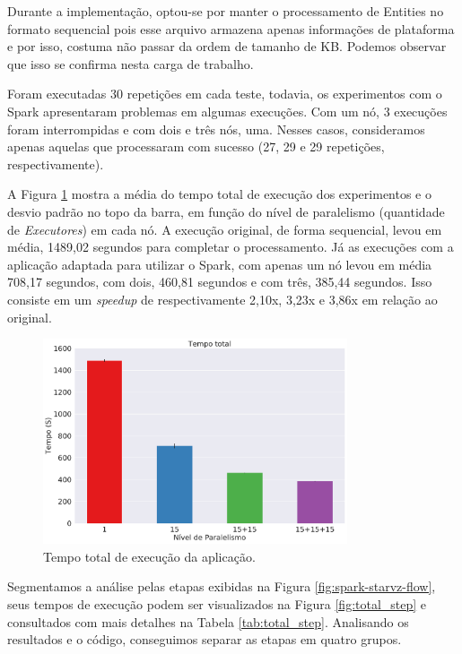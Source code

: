 Durante a implementação, optou-se por manter o processamento de Entities
no formato sequencial pois esse arquivo armazena apenas informações de 
plataforma e por isso, costuma não passar da ordem de tamanho de KB. Podemos 
observar que isso se confirma nesta carga de trabalho.


Foram executadas 30 repetições em cada teste, todavia, os experimentos com o 
Spark apresentaram problemas em algumas execuções. Com um nó, 3 execuções foram 
interrompidas e com dois e três nós, uma. Nesses casos, consideramos apenas 
aquelas que processaram com sucesso (27, 29 e 29 repetições, respectivamente). 

A Figura \ref{fig:total_full} mostra a média do tempo total de execução dos 
experimentos e o desvio padrão no topo da barra, em função do nível de 
paralelismo (quantidade de \emph{Executores}) em cada nó. A execução 
original, de forma sequencial, levou em média, 1489,02 segundos para completar 
o processamento. Já as execuções com a aplicação adaptada para utilizar o 
Spark, com apenas um nó levou em média 708,17 segundos, com dois, 460,81 
segundos e com três, 385,44 segundos. Isso consiste em um \emph{speedup} de 
respectivamente 2,10x, 3,23x e 3,86x em relação ao original.

\begin{figure}[ht]
\centerline{
\includegraphics[width=0.8\textwidth]{./img/total.pdf}}
 \caption{Tempo total de execução da aplicação.}
 \label{fig:total_full}
\end{figure}


Segmentamos a análise pelas etapas exibidas na Figura 
\ref{fig:spark-starvz-flow}, seus tempos de execução podem ser visualizados na 
Figura \ref{fig:total_step} e consultados com mais detalhes na Tabela 
\ref{tab:total_step}. Analisando os resultados e o código, conseguimos 
separar as etapas em quatro grupos.

